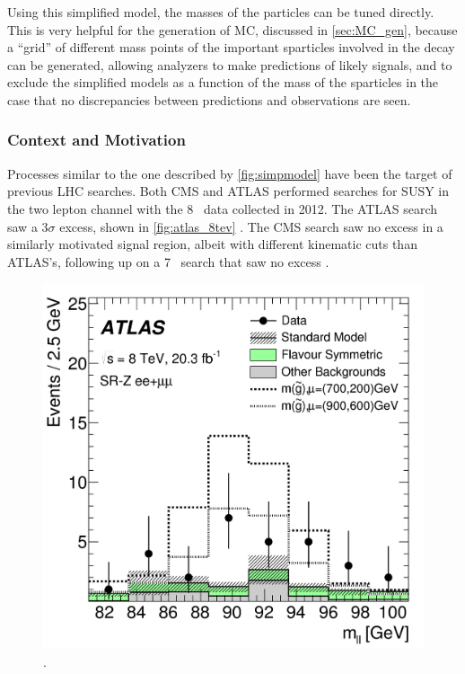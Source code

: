 Using this simplified model, the masses of the particles can be tuned directly. This is very helpful for the generation of \ac{MC}, discussed in \autoref{sec:MC_gen}, because a ``grid'' of different mass points of the important sparticles involved in the decay can be generated, allowing analyzers to make predictions of likely signals, and to exclude the simplified models as a function of the mass of the sparticles in the case that no discrepancies between predictions and observations are seen. 

\subsubsection{Context and Motivation}

Processes similar to the one described by \autoref{fig:simpmodel} have been the target of previous \ac{LHC} searches. Both \ac{CMS} and ATLAS performed searches for \ac{SUSY} in the two lepton channel with the 8 \tev~data collected in 2012. The ATLAS search saw a 3$\sigma$ excess, shown in \autoref{fig:atlas_8tev} \cite{SUSY-2014-10}. The \ac{CMS} search saw no excess in a similarly motivated signal region, albeit with different kinematic cuts than ATLAS's, following up on a 7 \tev~search that saw no excess \cite{Chatrchyan:2012qka, CMS2}. 

\begin{centering}
\begin{figure}[!hbt]
\myfloatalign
\includegraphics[width=.9\linewidth]{figures/theory/figaux_12a.png}
\caption{ \cite{SUSY-2014-10}.}
\label{fig:atlas_8tev}
\end{figure}
\end{centering}

